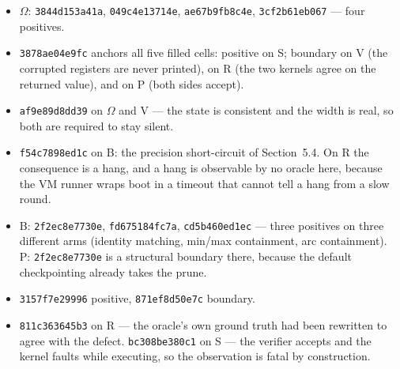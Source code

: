\begin{itemize}\setlength{\itemsep}{1pt}\sloppy\emergencystretch=2em
\item[1.] $\Omega$: \texttt{3844d153a41a}, \texttt{049c4e13714e},
  \texttt{ae67b9fb8c4e}, \texttt{3cf2b61eb067} --- four positives.
\item[2.] \texttt{3878ae04e9fc} anchors all five filled cells: positive on S;
  boundary on V (the corrupted registers are never printed), on R (the two kernels
  agree on the returned value), and on P (both sides accept).
\item[3.] \texttt{af9e89d8dd39} on $\Omega$ and V --- the state is consistent and the
  width is real, so both are required to stay silent.
\item[4.] \texttt{f54c7898ed1c} on B: the precision short-circuit of Section~5.4. On
  R the consequence is a hang, and a hang is observable by no oracle here, because
  the VM runner wraps boot in a timeout that cannot tell a hang from a slow round.
\item[5.] B: \texttt{2f2ec8e7730e}, \texttt{fd675184fc7a}, \texttt{cd5b460ed1ec} ---
  three positives on three different arms (identity matching, min/max containment,
  arc containment). P: \texttt{2f2ec8e7730e} is a structural boundary there, because
  the default checkpointing already takes the prune.
\item[7.] \texttt{3157f7e29996} positive, \texttt{871ef8d50e7c} boundary.
\item[8.] \texttt{811c363645b3} on R --- the oracle's own ground truth had been
  rewritten to agree with the defect. \texttt{bc308be380c1} on S --- the verifier
  accepts and the kernel faults while executing, so the observation is fatal by
  construction.
\end{itemize}
